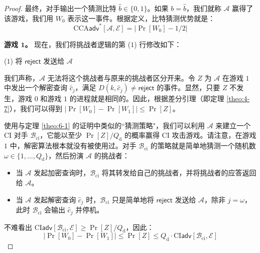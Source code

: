 \begin{proof}
\vspace*{10pt}

\noindent
最终，对手输出一个猜测比特 $\hat{b}\in\{0,1\}$。如果 $b=\hat{b}$，我们就称 $\mathcal{A}$ 赢得了该游戏，我们用 $W_0$ 表示这一事件。根据定义，比特猜测优势就是：
\begin{equation}\label{eq:9-5}
\mathrm{CCA}\mathsf{adv}^*[\mathcal{A},\mathcal{E}]
=
\big\lvert
\Pr[W_0]-1/2
\big\rvert
\end{equation}

\noindent\textbf{游戏 $\mathbf{1}$。} 现在，我们将挑战者逻辑的第 ($1$) 行修改如下：

\vspace*{10pt}

\noindent
\hspace*{5pt} ($1$)
\hspace*{24.5pt} 将 $\mathsf{reject}$ 发送给 $\mathcal{A}$

\vspace*{10pt}

\noindent
我们声称，$\mathcal{A}$ 无法将这个挑战者与原来的挑战者区分开来。令 $Z$ 为 $\mathcal{A}$ 在游戏 $1$ 中发出一个解密查询 $\hat{c}_j$，满足 $D(k,\hat{c}_j)\neq\mathsf{reject}$ 的事件。显然，只要 $Z$ 不发生，游戏 $0$ 和游戏 $1$ 的进程就是相同的。因此，根据差分引理（即定理 \ref{theo:4-7}），我们可以得到 $|\Pr[W_0]-\Pr[W_1]|\leq\Pr[Z]$。

使用与定理 \ref{theo:6-1} 的证明中类似的``猜测策略"，我们可以利用 $\mathcal{A}$ 来建立一个 CI 对手 $\mathcal{B}_\mathrm{ci}$，它能以至少 $\Pr[Z]/Q_\mathrm{d}$ 的概率赢得 CI 攻击游戏。请注意，在游戏 $1$ 中，解密算法根本就没有被使用过。对手 $\mathcal{B}_\mathrm{ci}$ 的策略就是简单地猜测一个随机数 $\omega\in\{1,\dots,Q_\mathrm{d}\}$，然后扮演 $\mathcal{A}$ 的挑战者：
\begin{itemize}
	\item 当 $\mathcal{A}$ 发起加密查询时，$\mathcal{B}_\mathrm{ci}$ 将其转发给自己的挑战者，并将挑战者的应答返回给 $\mathcal{A}$。
	\item 当 $\mathcal{A}$ 发起解密查询 $\hat{c}_j$ 时，$\mathcal{B}_\mathrm{ci}$ 只是简单地将 $\mathsf{reject}$ 发送给 $\mathcal{A}$，除非 $j=\omega$，此时 $\mathcal{B}_\mathrm{ci}$ 会输出 $\hat{c}_j$ 并停机。
\end{itemize}
不难看出 $\mathrm{CI}\mathsf{adv}[\mathcal{B}_\mathrm{ci},\mathcal{E}]\geq\Pr[Z]/Q_\mathrm{d}$，因此：
\begin{equation}\label{eq:9-6}
\big\lvert
\Pr[W_0]-\Pr[W_1]
\big\rvert
\leq
\Pr[Z]
\leq
Q_\mathrm{d}\cdot
\mathrm{CI}\mathsf{adv}[\mathcal{B}_\mathrm{ci},\mathcal{E}]
\end{equation}


\end{proof}
